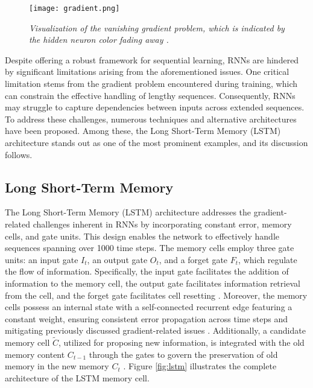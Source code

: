 \begin{figure}[H]
    \centering
    \texttt{[image: gradient.png]}
    \caption[Visualization of the vanishing gradient problem \cite{lipton2015critical}.]{
        \it{Visualization of the vanishing gradient problem, which is indicated by the
            hidden neuron color fading away \cite{lipton2015critical}.}
    }
    \label{fig:gradient}
\end{figure}

Despite offering a robust framework for sequential learning, RNNs are hindered by significant limitations arising from the aforementioned issues. One critical limitation stems from the gradient problem encountered during training, which can constrain the effective handling of lengthy sequences. Consequently, RNNs may struggle to capture dependencies between inputs across extended sequences. To address these challenges, numerous techniques and alternative architectures have been proposed. Among these, the Long Short-Term Memory (LSTM) architecture stands out as one of the most prominent examples, and its discussion follows.

\subsection{Long Short-Term Memory}

The Long Short-Term Memory (LSTM) \cite{10.1162/neco.1997.9.8.1735} architecture addresses the gradient-related challenges inherent in RNNs by incorporating constant error, memory cells, and gate units. This design enables the network to effectively handle sequences spanning over 1000 time steps. The memory cells employ three gate units: an input gate \(I_t\), an output gate \(O_t\), and a forget gate \(F_t\), which regulate the flow of information. Specifically, the input gate facilitates the addition of information to the memory cell, the output gate facilitates information retrieval from the cell, and the forget gate facilitates cell resetting \cite{schmidt2019recurrent}. Moreover, the memory cells possess an internal state with a self-connected recurrent edge featuring a constant weight, ensuring consistent error propagation across time steps and mitigating previously discussed gradient-related issues \cite{lipton2015critical}. Additionally, a candidate memory cell \(\tilde{C}\), utilized for proposing new information, is integrated with the old memory content \(C_{t-1}\) through the gates to govern the preservation of old memory in the new memory \(C_t\) \cite{schmidt2019recurrent}. Figure \ref{fig:lstm} illustrates the complete architecture of the LSTM memory cell.

